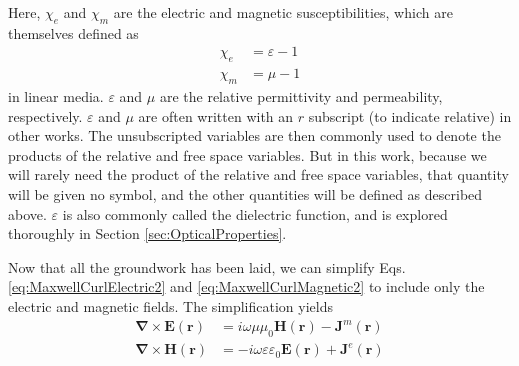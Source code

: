 Here, $\chi_{e}$ and $\chi_{m}$ are the electric and magnetic susceptibilities, which are themselves defined as
%
\begin{subequations}
\begin{align}
\chi_{e} &= \varepsilon - 1 \label{eq:ElectricSusceptibility}
\\
\chi_{m} &= \mu - 1
\end{align}
\end{subequations}
%
in linear media. $\varepsilon$ and $\mu$ are the relative permittivity and permeability, respectively. $\varepsilon$ and $\mu$ are often written with an $r$ subscript (to indicate relative) in other works. The unsubscripted variables are then commonly used to denote the products of the relative and free space variables. But in this work, because we will rarely need the product of the relative and free space variables, that quantity will be given no symbol, and the other quantities will be defined as described above. $\varepsilon$ is also commonly called the dielectric function, and is explored thoroughly in Section \ref{sec:OpticalProperties}.

Now that all the groundwork has been laid, we can simplify Eqs. \ref{eq:MaxwellCurlElectric2} and \ref{eq:MaxwellCurlMagnetic2} to include only the electric and magnetic fields. The simplification yields
%
\begin{subequations}
\begin{align}
\boldsymbol{\nabla} \times \boldsymbol{E}(\boldsymbol{r}) &= i \omega \mu \mu_{0} \boldsymbol{H}(\boldsymbol{r}) - \boldsymbol{J}^m(\boldsymbol{r}) \label{eq:MaxwellCurlElectric3}
\\
\boldsymbol{\nabla} \times \boldsymbol{H}(\boldsymbol{r}) &= - i \omega \varepsilon \varepsilon_{0} \boldsymbol{E}(\boldsymbol{r}) + \boldsymbol{J}^e(\boldsymbol{r}) \label{eq:MaxwellCurlMagnetic3}
\end{align}
\end{subequations}

